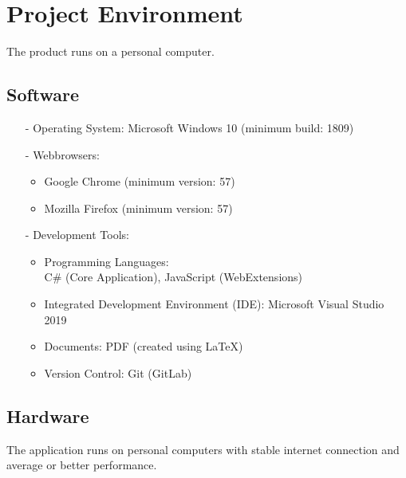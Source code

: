 \chapter{Project Environment}
\label{ch:environment}

The product runs on a personal computer.

\section{Software}
\begin{itemize}
\item[-] Operating System: Microsoft Windows 10 (minimum build: 1809)
\item[-] Webbrowsers:
	\begin{itemize}
	\item Google Chrome (minimum version: 57)
	\item Mozilla Firefox (minimum version: 57)
	\end{itemize}

\item[-] Development Tools:
	\begin{itemize}
	\item Programming Languages: \\C\# (Core Application), JavaScript (WebExtensions)
	\item Integrated Development Environment (IDE): Microsoft Visual Studio 2019
	\item Documents: PDF (created using LaTeX)
	\item Version Control: Git (GitLab)
	\end{itemize}
\end{itemize}
\section{Hardware}

The application runs on personal computers with stable internet connection and average or better performance.